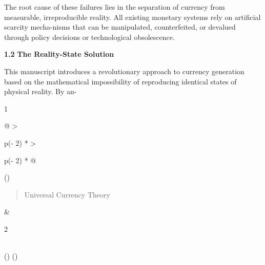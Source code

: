 \documentclass[
]{article}
\begin{document}
The root cause of these failures lies in the separation of currency from
measurable, irreproducible reality. All existing monetary systems rely
on artificial scarcity mecha-nisms that can be manipulated,
counterfeited, or devalued through policy decisions or technological
obsolescence.

\textbf{1.2} \textbf{The Reality-State Solution}

This manuscript introduces a revolutionary approach to currency
generation based on the mathematical impossibility of reproducing
identical states of physical reality. By an-

1

\begin{longtable}[]{@{}
  >{\raggedright\arraybackslash}p{(\columnwidth - 2\tabcolsep) * }
  >{\raggedright\arraybackslash}p{(\columnwidth - 2\tabcolsep) * }@{}}
\toprule()
\begin{minipage}[b]{\linewidth}\raggedright
\begin{quote}
Universal Currency Theory
\end{quote}
\end{minipage} & \begin{minipage}[b]{\linewidth}\raggedright
2
\end{minipage} \\
\midrule()
\endhead
\bottomrule()
\end{longtable}
\end{document}
